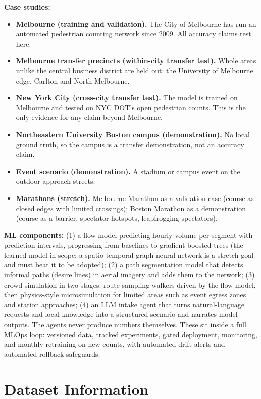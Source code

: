 \documentclass[11pt]{article}
\begin{document}
\textbf{Case studies:}
\begin{itemize}
  \item \textbf{Melbourne (training and validation).} The City of Melbourne has run an automated pedestrian counting network since 2009. All accuracy claims rest here.
  \item \textbf{Melbourne transfer precincts (within-city transfer test).} Whole areas unlike the central business district are held out: the University of Melbourne edge, Carlton and North Melbourne.
  \item \textbf{New York City (cross-city transfer test).} The model is trained on Melbourne and tested on NYC DOT's open pedestrian counts. This is the only evidence for any claim beyond Melbourne.
  \item \textbf{Northeastern University Boston campus (demonstration).} No local ground truth, so the campus is a transfer demonstration, not an accuracy claim.
  \item \textbf{Event scenario (demonstration).} A stadium or campus event on the outdoor approach streets.
  \item \textbf{Marathons (stretch).} Melbourne Marathon as a validation case (course as closed edges with limited crossings); Boston Marathon as a demonstration (course as a barrier, spectator hotspots, leapfrogging spectators).
\end{itemize}

\textbf{ML components:} (1) a flow model predicting hourly volume per segment with prediction intervals, progressing from baselines to gradient-boosted trees (the learned model in scope; a spatio-temporal graph neural network is a stretch goal and must beat it to be adopted); (2) a path segmentation model that detects informal paths (desire lines) in aerial imagery and adds them to the network; (3) crowd simulation in two stages: route-sampling walkers driven by the flow model, then physics-style microsimulation for limited areas such as event egress zones and station approaches; (4) an LLM intake agent that turns natural-language requests and local knowledge into a structured scenario and narrates model outputs. The agents never produce numbers themselves. These sit inside a full MLOps loop: versioned data, tracked experiments, gated deployment, monitoring, and monthly retraining on new counts, with automated drift alerts and automated rollback safeguards.

\section{Dataset Information}
\end{document}
